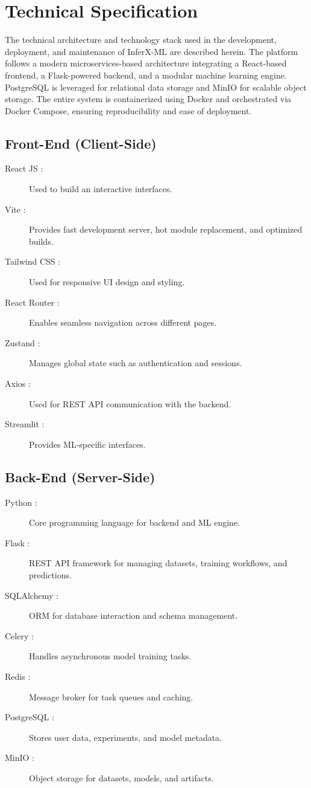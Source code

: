 \chapter{Technical Specification}
\vspace{-1cm}

The technical architecture and technology stack used in the development, deployment, and maintenance of InferX-ML are described herein. The platform follows a modern microservices-based architecture integrating a React-based frontend, a Flask-powered backend, and a modular machine learning engine. PostgreSQL is leveraged for relational data storage and MinIO for scalable object storage. The entire system is containerized using Docker and orchestrated via Docker Compose, ensuring reproducibility and ease of deployment.


\section{Front-End (Client-Side)}

\begin{description}
\item[React JS :] Used to build an interactive interfaces.
\item[Vite :] Provides fast development server, hot module replacement, and optimized builds.
\item[Tailwind CSS :] Used for responsive UI design and styling.
\item[React Router :] Enables seamless navigation across different pages.
\item[Zustand :] Manages global state such as authentication and sessions.
\item[Axios :] Used for REST API communication with the backend.
\item[Streamlit :] Provides ML-specific interfaces.
\end{description}


\section{Back-End (Server-Side)}

\begin{description}
\item[Python :] Core programming language for backend and ML engine.
\item[Flask :] REST API framework for managing datasets, training workflows, and predictions.
\item[SQLAlchemy :] ORM for database interaction and schema management.
\item[Celery :] Handles asynchronous model training tasks.
\item[Redis :] Message broker for task queues and caching.
\item[PostgreSQL :] Stores user data, experiments, and model metadata.
\item[MinIO :] Object storage for datasets, models, and artifacts.
\end{description}


